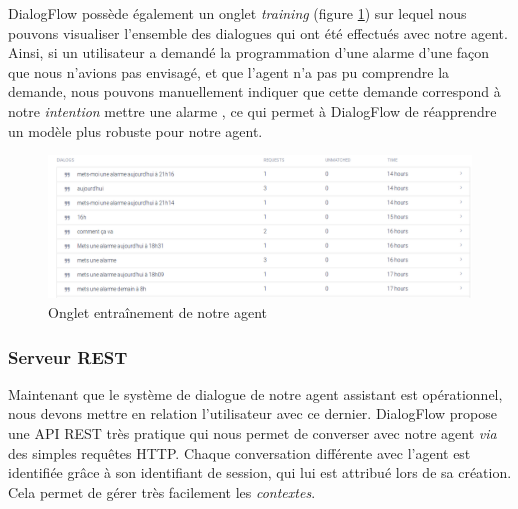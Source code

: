 DialogFlow possède également un onglet \og \emph{training} \fg{} (figure \ref{training}) sur lequel nous pouvons visualiser l'ensemble des dialogues qui ont été effectués avec notre agent. Ainsi,
si un utilisateur a demandé la programmation d'une alarme d'une façon que nous n'avions pas envisagé, et que l'agent n'a pas pu comprendre la demande, nous pouvons
manuellement indiquer que cette demande correspond à notre \emph{intention} \og mettre une alarme \fg, ce qui permet à DialogFlow de réapprendre un modèle plus robuste pour notre agent.

\begin{figure}[H]
    \centering
        \centering
        \includegraphics[width=1.2\textwidth]{images/training.png}
        \caption{Onglet entraînement de notre agent}
        \label{training}
\end{figure}


\subsubsection{Serveur REST}

Maintenant que le système de dialogue de notre agent assistant est opérationnel, nous devons mettre en relation l'utilisateur avec ce dernier. DialogFlow propose une API REST très pratique
qui nous permet de converser avec notre agent \emph{via} des simples requêtes HTTP. Chaque conversation différente avec l'agent est identifiée grâce à son identifiant de session,
qui lui est attribué lors de sa création. Cela permet de gérer très facilement les \emph{contextes}.\\

